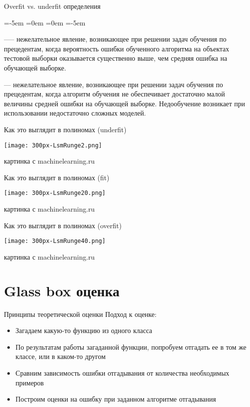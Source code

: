 \documentclass[14pt, fleqn, xcolor={dvipsnames, table}]{beamer}
\begin{document}
\begin{frame}{Overfit vs. underfit определения}
\small
\begin{description}
\leftmargin=-5em
\itemindent=0em
=0em
\leftskip=-5em
  \item[Переобучение, переподгонка (overtraining, overfitting)] —-- нежелательное явление, возникающее при решении задач обучения по прецедентам, когда вероятность ошибки обученного алгоритма на объектах тестовой выборки оказывается существенно выше, чем средняя ошибка на обучающей выборке. 
  \item[Недообучение (underfitting)] --- нежелательное явление, возникающее при решении задач обучения по прецедентам, когда алгоритм обучения не обеспечивает достаточно малой величины средней ошибки на обучающей выборке. Недообучение возникает при использовании недостаточно сложных моделей.
\end{description}
\end{frame}

\begin{frame}{Как это выглядит в полиномах (underfit)}
\begin{center}
\texttt{[image: 300px-LsmRunge2.png]}
\end{center}
{\footnotesize картинка с machinelearning.ru}
\end{frame}

\begin{frame}{Как это выглядит в полиномах (fit)}
\begin{center}
\texttt{[image: 300px-LsmRunge20.png]}
\end{center}
{\footnotesize картинка с machinelearning.ru}
\end{frame}

\begin{frame}{Как это выглядит в полиномах (overfit)}
\begin{center}
\texttt{[image: 300px-LsmRunge40.png]}
\end{center}
{\footnotesize картинка с machinelearning.ru}
\end{frame}

\section{Glass box оценка}

\begin{frame}{Принципы теоретической оценки}
Подход к оценке:
\begin{itemize}
  \item Загадаем какую-то функцию из одного класса
  \item По результатам работы загаданной функции, попробуем отгадать ее в том же классе, или в каком-то другом
  \item Сравним зависимость ошибки отгадывания от количества необходимых примеров
  \item Построим оценки на ошибку при заданном алгоритме отгадывания
\end{itemize}
\end{frame}
\end{document}
